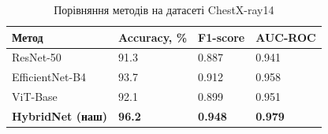 \begin{table}[H]
  \caption{Порівняння методів на датасеті ChestX-ray14}
  \label{tbl:results}
  \centering
  \begin{tabularx}{\linewidth}{|Y|Y|Y|Y|}
    \hline
    \textbf{Метод} & \textbf{Accuracy, \%} & \textbf{F1-score} & \textbf{AUC-ROC} \\ \hline
    ResNet-50                   & 91.3          & 0.887          & 0.941          \\ \hline
    EfficientNet-B4             & 93.7          & 0.912          & 0.958          \\ \hline
    ViT-Base                    & 92.1          & 0.899          & 0.951          \\ \hline
    \textbf{HybridNet (наш)}    & \textbf{96.2} & \textbf{0.948} & \textbf{0.979} \\ \hline
  \end{tabularx}
\end{table}
